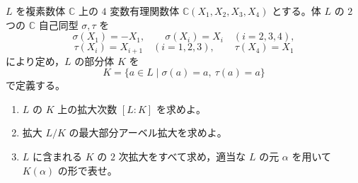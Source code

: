 \newcommand{\C}{\mathbb{C}}
\newcommand{\R}{\mathbb{R}}
\newcommand{\Z}{\mathbb{Z}}
\newcommand{\Tr}{\operatorname{Tr}}
\newcommand{\Impart}{\operatorname{Im}}
\newcommand{\AF}{\operatorname{AF}}
\newcommand{\AX}{\operatorname{AX}}
\newcommand{\GL}{\operatorname{GL}}


\(L\) を複素数体 \(\C\) 上の \(4\) 変数有理関数体
\(\C(X_1,X_2,X_3,X_4)\) とする。体 \(L\) の \(2\) つの \(\C\) 自己同型 \(\sigma,\tau\) を
\[
  \sigma(X_1)=-X_1,\qquad
  \sigma(X_i)=X_i\quad (i=2,3,4),
\]
\[
  \tau(X_i)=X_{i+1}\quad (i=1,2,3),\qquad
  \tau(X_4)=X_1
\]
により定め，\(L\) の部分体 \(K\) を
\[
  K=\{a\in L\mid \sigma(a)=a,\ \tau(a)=a\}
\]
で定義する。

\begin{enumerate}
  \item \(L\) の \(K\) 上の拡大次数 \([L:K]\) を求めよ。
  \item 拡大 \(L/K\) の最大部分アーベル拡大を求めよ。
  \item \(L\) に含まれる \(K\) の \(2\) 次拡大をすべて求め，適当な \(L\) の元 \(\alpha\) を用いて \(K(\alpha)\) の形で表せ。
\end{enumerate}

%